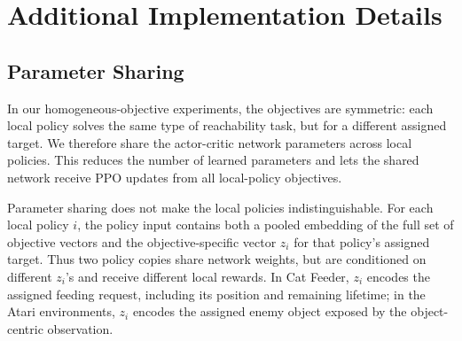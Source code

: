 \section{Additional Implementation Details}
\label{app:additional-implementation-details}

\subsection{Parameter Sharing}
\label{app:parameter-sharing}

In our homogeneous-objective experiments, the objectives are symmetric: each local policy solves the same type of reachability task, but for a different assigned target. We therefore share the actor-critic network parameters across local policies. This reduces the number of learned parameters and lets the shared network receive PPO updates from all local-policy objectives.

Parameter sharing does not make the local policies indistinguishable. For each local policy \(i\), the policy input contains both a pooled embedding of the full set of objective vectors and the objective-specific vector \(z_i\) for that policy's assigned target. Thus two policy copies share network weights, but are conditioned on different \(z_i\)'s and receive different local rewards. In Cat Feeder, \(z_i\) encodes the assigned feeding request, including its position and remaining lifetime; in the Atari environments, \(z_i\) encodes the assigned enemy object exposed by the object-centric observation.

